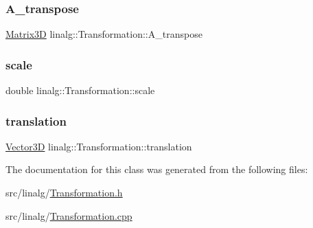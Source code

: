 \subsubsection{\texorpdfstring{A\_transpose}{A\_transpose}}
{\footnotesize\ttfamily \mbox{\hyperlink{classlinalg_1_1Matrix3D}{Matrix3D}} linalg\+::\+Transformation\+::\+A\+\_\+transpose\hspace{0.3cm}{\ttfamily [private]}}

\mbox{\label{classlinalg_1_1Transformation_ac627b1362463a8c98fe3b5e633beb049}} 
\subsubsection{\texorpdfstring{scale}{scale}}
{\footnotesize\ttfamily double linalg\+::\+Transformation\+::scale\hspace{0.3cm}{\ttfamily [private]}}

\mbox{\label{classlinalg_1_1Transformation_a462cf5d72735591b01bef5186bb1fe98}} 
\subsubsection{\texorpdfstring{translation}{translation}}
{\footnotesize\ttfamily \mbox{\hyperlink{classVector3D}{Vector3D}} linalg\+::\+Transformation\+::translation\hspace{0.3cm}{\ttfamily [private]}}



The documentation for this class was generated from the following files\+:\begin{DoxyCompactItemize}
\item 
src/linalg/\mbox{\hyperlink{Transformation_8h}{Transformation.\+h}}\item 
src/linalg/\mbox{\hyperlink{Transformation_8cpp}{Transformation.\+cpp}}\end{DoxyCompactItemize}
